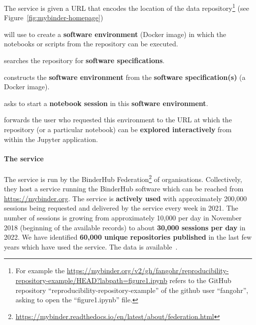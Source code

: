 \begin{compactitem}
\item The \binderhub{} service is given a URL that encodes the location of the data
  repository\footnote{For example the
    {\url{https://mybinder.org/v2/gh/fangohr/reproducibility-repository-example/HEAD?labpath=figure1.ipynb}}
    refers to the GitHub repository ``reproducibility-repository-example'' of the
    github user ``fangohr'', asking to open the ``figure1.ipynb'' file.}
  (see Figure~\ref{fig:mybinder-homepage})
\item \binderhub{} will use
  \repotodocker{} to create a \textbf{software environment} (Docker image)
  in which the notebooks or scripts from the repository can be executed.
\item \repotodocker{} searches the repository for \textbf{software specifications}.
\item \repotodocker{} constructs the \textbf{software environment}
  from the \textbf{software specification(s)} (a Docker image).
\item \binderhub{} asks \JupyterHub to start
  a \textbf{notebook session} in this \textbf{software environment}.
\item \binderhub{} forwards the user who requested this environment to
  the URL at which the repository (or a particular notebook) can be
  \textbf{explored interactively} from within the Jupyter application.
\end{compactitem}

\paragraph{The \mybinder{} service}\label{sec:mybinder}

The \mybinder{} service is run by the BinderHub
Federation\footnote{\url{https://mybinder.readthedocs.io/en/latest/about/federation.html}}
of organisations. Collectively, they host a service running the BinderHub software
which can be reached from \url{https://mybinder.org}.
The service is \textbf{actively used} with approximately 200,000 sessions being
requested and delivered by the \mybinder{} service every week in 2021. The number
of sessions is growing from approximately 10,000 per day in November 2018
(beginning of the available records) to about \textbf{30,000 sessions per day} in 2022. We have
identified \textbf{60,000 unique repositories published} in the last few years which have
used the \mybinder{} service. The data is available~\cite{mybinder-archive}.

